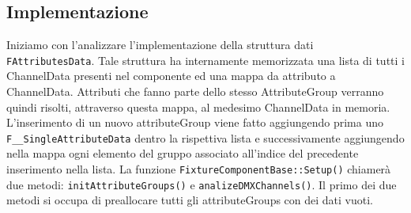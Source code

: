 \documentclass[main.tex]{subfiles}
\begin{document}

\subsection{Implementazione}\label{subsec:3_implementation}
Iniziamo con l'analizzare l'implementazione della struttura dati \lstinline{FAttributesData}. Tale struttura ha internamente memorizzata una lista di tutti i ChannelData presenti nel componente ed una mappa da attributo a ChannelData. Attributi che fanno parte dello stesso AttributeGroup verranno quindi risolti, attraverso questa mappa, al medesimo ChannelData in memoria. \newline
\lstset{language=UEcpp}
%
L'inserimento di un nuovo attributeGroup viene fatto aggiungendo prima uno \lstinline{F__SingleAttributeData} dentro la rispettiva lista e successivamente aggiungendo nella mappa ogni elemento del gruppo associato all'indice del precedente inserimento nella lista.\newline
La funzione \lstinline{FixtureComponentBase::Setup()} chiamerà due metodi: \lstinline{initAttributeGroups()} e \lstinline{analizeDMXChannels()}. Il primo dei due metodi si occupa di preallocare tutti gli attributeGroups con dei dati vuoti.
%
\end{document}
